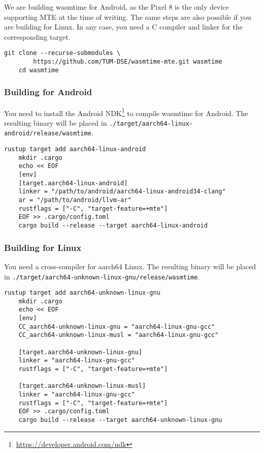 We are building wasmtime for Android, as the Pixel 8 is the only device supporting \ac{MTE} at the time of writing.
The same steps are also possible if you are building for Linux.
In any case, you need a C compiler and linker for the corresponding target.

\begin{lstlisting}[label={lst:building-wasmtime}]
    git clone --recurse-submodules \
        https://github.com/TUM-DSE/wasmtime-mte.git wasmtime
    cd wasmtime
\end{lstlisting}

\subsubsection{Building for Android}

You need to install the Android NDK\footnote{\url{https://developer.android.com/ndk}} to compile wasmtime for Android.
The resulting binary will be placed in \texttt{./target/aarch64-linux-android/release/wasmtime}.

\begin{lstlisting}[label={lst:configuring-wasmtime-android}]
    rustup target add aarch64-linux-android
    mkdir .cargo
    echo << EOF
    [env]
    [target.aarch64-linux-android]
    linker = "/path/to/android/aarch64-linux-android34-clang"
    ar = "/path/to/android/llvm-ar"
    rustflags = ["-C", "target-feature=+mte"]
    EOF >> .cargo/config.toml
    cargo build --release --target aarch64-linux-android
\end{lstlisting}

\subsubsection{Building for Linux}

You need a cross-compiler for aarch64 Linux.
The resulting binary will be placed in \texttt{./target/aarch64-unknown-linux-gnu/release/wasmtime}.

\begin{lstlisting}[label={lst:configuring-wasmtime-linux}]
    rustup target add aarch64-unknown-linux-gnu
    mkdir .cargo
    echo << EOF
    [env]
    CC_aarch64-unknown-linux-gnu = "aarch64-linux-gnu-gcc"
    CC_aarch64-unknown-linux-musl = "aarch64-linux-gnu-gcc"

    [target.aarch64-unknown-linux-gnu]
    linker = "aarch64-linux-gnu-gcc"
    rustflags = ["-C", "target-feature=+mte"]

    [target.aarch64-unknown-linux-musl]
    linker = "aarch64-linux-gnu-gcc"
    rustflags = ["-C", "target-feature=+mte"]
    EOF >> .cargo/config.toml
    cargo build --release --target aarch64-unknown-linux-gnu
\end{lstlisting}

